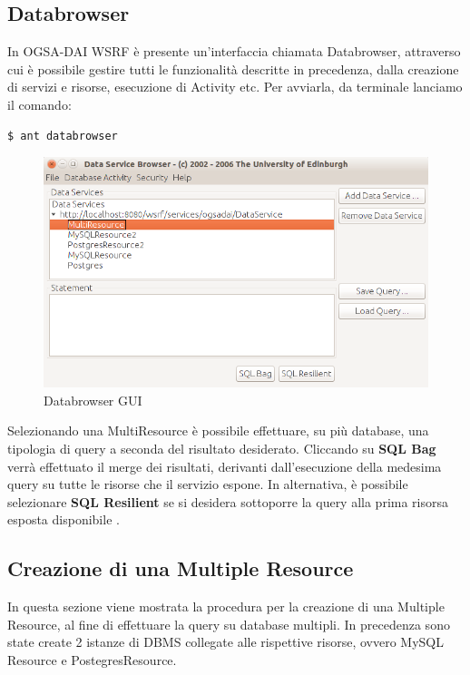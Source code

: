 \documentclass[11pt]{article}
\begin{document}
\subsection{Databrowser}

In OGSA-DAI WSRF è presente un'interfaccia chiamata Databrowser, attraverso cui è possibile gestire tutti le funzionalità descritte in precedenza, dalla creazione di servizi e risorse, esecuzione di Activity etc. Per avviarla, da terminale lanciamo il comando: 

\begin{lstlisting}[language=bash]
$ ant databrowser
\end{lstlisting}

\begin{figure}[H]
	\centering
	\includegraphics[scale=0.9]{images/databrowser.png}
	\caption{Databrowser GUI}
	\label{databrowser}
\end{figure}

Selezionando una MultiResource è possibile effettuare, su più database, una tipologia di query a seconda del risultato desiderato. Cliccando su \textbf{SQL Bag} verrà effettuato il merge dei risultati, derivanti dall'esecuzione della medesima query su tutte le risorse che il servizio espone. In alternativa, è possibile selezionare \textbf{SQL Resilient} se si desidera sottoporre la query alla prima risorsa esposta disponibile \cite{ogsadai}.
\newpage

\subsection{Creazione di una Multiple Resource}

In questa sezione viene mostrata la procedura per la creazione di una Multiple Resource, al fine di effettuare la query su database multipli. In precedenza sono state create 2 istanze di DBMS collegate alle rispettive risorse, ovvero MySQL Resource e PostegresResource. \\
\end{document}

